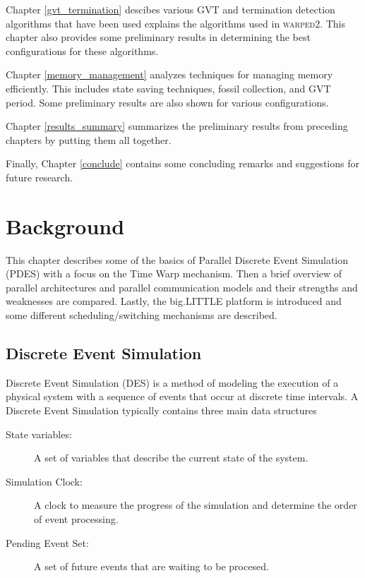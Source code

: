 \documentclass[11pt]{book}
\begin{document}
Chapter \ref{gvt_termination} descibes various GVT and termination detection algorithms that
have been used explains the algorithms used in \textsc{warped2}. This chapter also provides
some preliminary results in determining the best configurations for these algorithms.

Chapter \ref{memory_management} analyzes techniques for managing memory efficiently. This
includes state saving techniques, fossil collection, and GVT period. Some preliminary results
are also shown for various configurations.

Chapter \ref{results_summary} summarizes the preliminary results from preceding chapters by
putting them all together.

Finally, Chapter \ref{conclude} contains some concluding remarks and suggestions for future
research.



\chapter{Background}\label{background}

This chapter describes some of the basics of Parallel Discrete Event Simulation (PDES) with
a focus on the Time Warp mechanism. Then a brief overview of parallel architectures and
parallel communication models and their strengths and weaknesses are compared. Lastly, the
big.LITTLE platform is introduced and some different scheduling/switching mechanisms are
described.

\section{Discrete Event Simulation}

Discrete Event Simulation (DES) is a method of modeling the execution of a physical system
with a sequence of events that occur at discrete time intervals. A Discrete Event Simulation
typically contains three main data structures

\begin{description}
    \item[State variables: ] A set of variables that describe the current state of the system.
    \item[Simulation Clock: ] A clock to measure the progress of the simulation and determine
        the order of event processing.
    \item[Pending Event Set: ] A set of future events that are waiting to be procesed.
\end{description}
\end{document}

